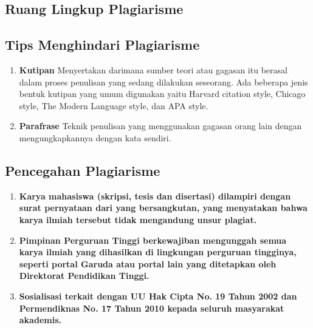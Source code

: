 \subsection{Ruang Lingkup Plagiarisme}

\subsection{Tips Menghindari Plagiarisme}
\begin{enumerate}
    \item \textbf{Kutipan} 
     \newline Menyertakan darimana sumber teori atau gagasan itu berasal dalam proses penulisan yang sedang dilakukan seseorang. Ada beberapa jenis bentuk kutipan yang umum digunakan yaitu Harvard citation style, Chicago style, The Modern Language style, dan APA style.
     \item \textbf{Parafrase}
     \newline Teknik penulisan yang menggunakan gagasan orang lain dengan mengungkapkannya dengan
kata sendiri.
\end{enumerate}

\subsection{Pencegahan Plagiarisme}
\begin{enumerate}
    \item \textbf{Karya mahasiswa (skripsi, tesis dan disertasi) dilampiri dengan surat pernyataan dari
    yang bersangkutan, yang menyatakan bahwa karya ilmiah tersebut tidak mengandung
    unsur plagiat.}
    \item \textbf{Pimpinan Perguruan Tinggi berkewajiban mengunggah semua karya ilmiah yang dihasilkan
    di lingkungan perguruan tingginya, seperti portal Garuda atau portal lain
    yang ditetapkan oleh Direktorat Pendidikan Tinggi.} 
    \item \textbf{Sosialisasi terkait dengan UU Hak Cipta No. 19 Tahun 2002 dan Permendiknas No. 17
    Tahun 2010 kepada seluruh masyarakat akademis.} 
\end{enumerate}


